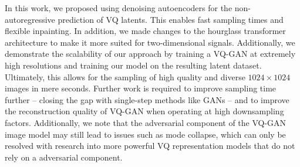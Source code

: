 In this work, we proposed using denoising autoencoders for the
non-autoregressive prediction of VQ latents. This enables fast sampling
times and flexible inpainting. In addition, we made changes to the hourglass
transformer architecture to make it more suited for two-dimensional signals.
Additionally, we demonstrate the scalability of our approach by training a
VQ-GAN at extremely high resolutions and training our model on the resulting
latent dataset. Ultimately, this allows for the sampling of high quality and
diverse $1024 \times 1024$ images in mere seconds. Further work is required to
improve sampling time further -- closing the gap with single-step methods like
GANs -- and to improve the reconstruction quality of VQ-GAN when operating at
high downsampling factors. Additionally, we note that the adversarial component
of the VQ-GAN image model may still lead to issues such as mode collapse, which
can only be resolved with research into more powerful VQ representation models
that do not rely on a adversarial component.
